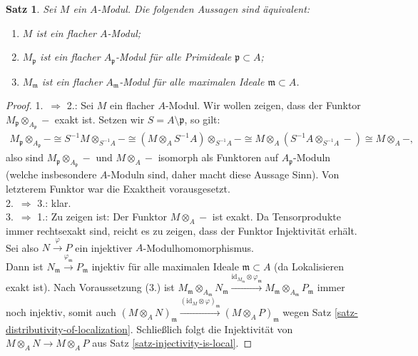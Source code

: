 \documentclass[reqno,12pt]{article}
\numberwithin{equation}{section}
\newcommand{\id}{\text{id}}
\theoremstyle{plain}
\newtheorem{proposition}[thm]{Satz}
\theoremstyle{definition}
\newcommand{\blank}{{-}}
\begin{document}
\begin{proposition}
Sei $M$ ein $A$-Modul. Die folgenden Aussagen sind äquivalent:
\begin{enumerate}
	\item $M$ ist ein flacher $A$-Modul;
	\item $M_\mathfrak{p}$ ist ein flacher $A_\mathfrak{p}$-Modul für alle Primideale $\mathfrak{p}\subset A$;
	\item $M_\mathfrak{m}$ ist ein flacher $A_\mathfrak{m}$-Modul für alle maximalen Ideale $\mathfrak{m}\subset A$.
\end{enumerate}
\end{proposition}
\begin{proof}
1.\ $\Rightarrow$ 2.: Sei $M$ ein flacher $A$-Modul. Wir wollen zeigen, dass der Funktor $M_\mathfrak{p}\otimes_{A_\mathfrak{p}}\blank$ exakt ist. Setzen wir $S=A\setminus \mathfrak{p}$, so gilt:
\begin{align*}
M_\mathfrak{p}\otimes_{A_\mathfrak{p}}\blank\cong S^{-1}M\otimes_{S^{-1}A}\blank \cong (M\otimes_A S^{-1}A)\otimes_{S^{-1}A}\blank \cong M\otimes_A(S^{-1}A\otimes_{S^{-1}A}\blank)\cong M\otimes_A \blank,
\end{align*} also sind $M_\mathfrak{p}\otimes_{A_\mathfrak{p}}\blank$ und $M\otimes_A \blank$ isomorph als Funktoren auf $A_\mathfrak{p}$-Moduln (welche insbesondere $A$-Moduln sind, daher macht diese Aussage Sinn).
Von letzterem Funktor war die Exaktheit vorausgesetzt.\\
2.\ $\Rightarrow$ 3.: klar.\\
3.\ $\Rightarrow$ 1.: Zu zeigen ist: Der Funktor $M\otimes_A\blank$ ist exakt. Da Tensorprodukte immer rechtsexakt sind, reicht es zu zeigen, dass der Funktor Injektivität erhält. Sei also $N\overset{\varphi}{\to}P$ ein injektiver $A$-Modulhomomorphismus.\\ Dann ist $N_\mathfrak{m}\overset{\varphi_\mathfrak{m}}{\to}P_\mathfrak{m}$ injektiv für alle maximalen Ideale $\mathfrak{m}\subset A$ (da Lokalisieren exakt ist). Nach Voraussetzung (3.) ist $M_\mathfrak{m}\otimes_{A_\mathfrak{m}}N_\mathfrak{m}\overset{\id_{M_\mathfrak{m}}\otimes \varphi_\mathfrak{m}}{\longrightarrow}M_\mathfrak{m}\otimes_{A_\mathfrak{m}}P_\mathfrak{m}$ immer noch injektiv, somit auch $(M\otimes_A N)_\mathfrak{m}\overset{(\id_M\otimes \varphi)_\mathfrak{m}}{\longrightarrow}(M\otimes_A P)_\mathfrak{m}$ wegen Satz \ref{satz-distributivity-of-localization}. Schließlich folgt die Injektivität von $M\otimes_A N\to M\otimes_A P$ aus Satz \ref{satz-injectivity-is-local}.
\end{proof}



\newpage


\end{document}
